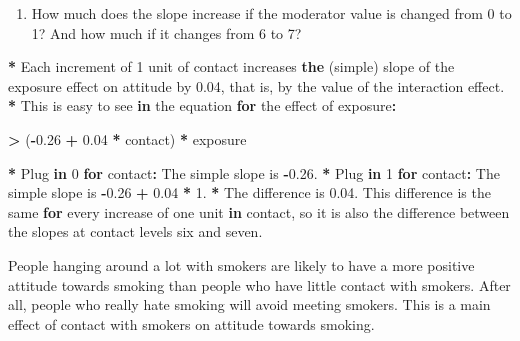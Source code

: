 \documentclass[a4paper]{book}
\newenvironment{Shaded}{\begin{snugshade}}{\end{snugshade}}
\newcommand{\KeywordTok}[1]{\textcolor[rgb]{0,0,0}{\textbf{#1}}}
\newcommand{\DecValTok}[1]{\textcolor[rgb]{0.00,0.00,0.00}{#1}}
\newcommand{\FloatTok}[1]{\textcolor[rgb]{0.00,0.00,0.00}{#1}}
\newcommand{\StringTok}[1]{\textcolor[rgb]{0.00,0.00,0.00}{#1}}
\newcommand{\ControlFlowTok}[1]{\textcolor[rgb]{0.00,0.00,0.00}{\textbf{#1}}}
\newcommand{\OperatorTok}[1]{\textcolor[rgb]{0.00,0.00,0.00}{\textbf{#1}}}
\newcommand{\ErrorTok}[1]{\textcolor[rgb]{0.00,0.00,0.00}{\textbf{#1}}}
\newcommand{\NormalTok}[1]{#1}
\providecommand{\tightlist}{%
  \setlength{\itemsep}{0pt}\setlength{\parskip}{0pt}}
\theoremstyle{definition}
\theoremstyle{definition}
\theoremstyle{definition}
\theoremstyle{remark}
\begin{document}
\begin{enumerate}
\def\labelenumi{\arabic{enumi}.}
\setcounter{enumi}{2}
\tightlist
\item
  How much does the slope increase if the moderator value is changed
  from 0 to 1? And how much if it changes from 6 to 7?
\end{enumerate}

\begin{Shaded}
\begin{Highlighting}[]
\OperatorTok{*}\StringTok{ }\NormalTok{Each increment of }\DecValTok{1}\NormalTok{ unit of contact increases }\KeywordTok{the}\NormalTok{ (simple) slope of the}
\NormalTok{exposure effect on attitude by }\FloatTok{0.04}\NormalTok{, that is, by the value of the interaction}
\NormalTok{effect.}
\OperatorTok{*}\StringTok{ }\NormalTok{This is easy to see }\ControlFlowTok{in}\NormalTok{ the equation }\ControlFlowTok{for}\NormalTok{ the effect of exposure}\OperatorTok{:}

\ErrorTok{>}\StringTok{ }\NormalTok{(}\OperatorTok{-}\FloatTok{0.26} \OperatorTok{+}\StringTok{ }\FloatTok{0.04} \OperatorTok{*}\StringTok{ }\NormalTok{contact) }\OperatorTok{*}\StringTok{ }\NormalTok{exposure}

\OperatorTok{*}\StringTok{ }\NormalTok{Plug }\ControlFlowTok{in} \DecValTok{0} \ControlFlowTok{for}\NormalTok{ contact}\OperatorTok{:}\StringTok{ }\NormalTok{The simple slope is }\OperatorTok{-}\FloatTok{0.26}\NormalTok{.}
\OperatorTok{*}\StringTok{ }\NormalTok{Plug }\ControlFlowTok{in} \DecValTok{1} \ControlFlowTok{for}\NormalTok{ contact}\OperatorTok{:}\StringTok{ }\NormalTok{The simple slope is }\OperatorTok{-}\FloatTok{0.26} \OperatorTok{+}\StringTok{ }\FloatTok{0.04} \OperatorTok{*}\StringTok{ }\DecValTok{1}\NormalTok{.}
\OperatorTok{*}\StringTok{ }\NormalTok{The difference is }\FloatTok{0.04}\NormalTok{. This difference is the same }\ControlFlowTok{for}\NormalTok{ every increase of}
\NormalTok{one unit }\ControlFlowTok{in}\NormalTok{ contact, so it is also the difference between the slopes at}
\NormalTok{contact levels six and seven.}
\end{Highlighting}
\end{Shaded}

People hanging around a lot with smokers are likely to have a more
positive attitude towards smoking than people who have little contact
with smokers. After all, people who really hate smoking will avoid
meeting smokers. This is a main effect of contact with smokers on
attitude towards smoking.
\end{document}
